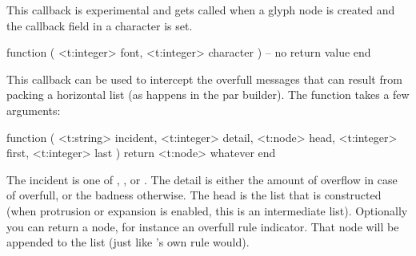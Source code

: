 \startsubsection[title=process_character]

This callback is experimental and gets called when a glyph node is created and
the callback field in a character is set.

\starttyping[option=LUA]
function (
    <t:integer> font,
    <t:integer> character
)
    -- no return value
end
\stoptyping

\stopsubsection

\startsubsection[title=tail_append]





\stopsubsection

\stopsection

\startsection[title=Tracing]

\startsubsection[title=hpack_quality]

This callback can be used to intercept the overfull messages that can result from
packing a horizontal list (as happens in the par builder). The function takes a
few arguments:

\starttyping[option=LUA]
function (
    <t:string>  incident,
    <t:integer> detail,
    <t:node>    head,
    <t:integer> first,
    <t:integer> last
 )
    return <t:node> whatever
end
\stoptyping

The incident is one of , ,  or
. The detail is either the amount of overflow in case of \type
{overfull}, or the badness otherwise. The head is the list that is constructed
(when protrusion or expansion is enabled, this is an intermediate list).
Optionally you can return a node, for instance an overfull rule indicator. That
node will be appended to the list (just like \TEX's own rule would).


